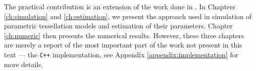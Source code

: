 The practical contribution is an extension of the work done in \cite{DereudreLavancier2011}. In Chapters \ref{ch:simulation} and \ref{ch:estimation}, we present the approach used in simulation of parametric tessellation models and estimation of their parameters. Chapter \ref{ch:numeric} then presents the numerical results. However, these three chapters are merely a report of the most important part of the work not present in this text --- the \texttt{C++} implementation, see Appendix \ref{appendix:implementation} for more details. 

